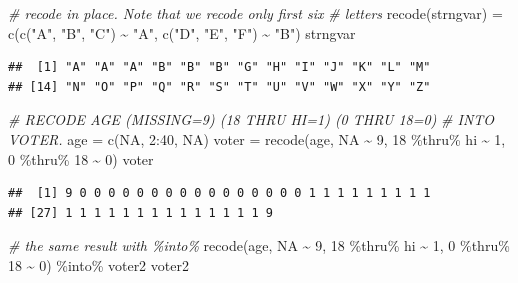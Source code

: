\documentclass[
]{book}
\newenvironment{Shaded}{\begin{snugshade}}{\end{snugshade}}
\newcommand{\CommentTok}[1]{\textcolor[rgb]{0.56,0.35,0.01}{\textit{#1}}}
\newcommand{\ConstantTok}[1]{\textcolor[rgb]{0.00,0.00,0.00}{#1}}
\newcommand{\DecValTok}[1]{\textcolor[rgb]{0.00,0.00,0.81}{#1}}
\newcommand{\FunctionTok}[1]{\textcolor[rgb]{0.00,0.00,0.00}{#1}}
\newcommand{\NormalTok}[1]{#1}
\newcommand{\OtherTok}[1]{\textcolor[rgb]{0.56,0.35,0.01}{#1}}
\newcommand{\SpecialCharTok}[1]{\textcolor[rgb]{0.00,0.00,0.00}{#1}}
\newcommand{\StringTok}[1]{\textcolor[rgb]{0.31,0.60,0.02}{#1}}
\begin{document}
\begin{Shaded}
\begin{Highlighting}[]
\CommentTok{\# recode in place. Note that we recode only first six}
\CommentTok{\# letters}
\FunctionTok{recode}\NormalTok{(strngvar) }\OtherTok{=} \FunctionTok{c}\NormalTok{(}\FunctionTok{c}\NormalTok{(}\StringTok{"A"}\NormalTok{, }\StringTok{"B"}\NormalTok{, }\StringTok{"C"}\NormalTok{) }\SpecialCharTok{\textasciitilde{}} \StringTok{"A"}\NormalTok{, }\FunctionTok{c}\NormalTok{(}\StringTok{"D"}\NormalTok{, }\StringTok{"E"}\NormalTok{,}
  \StringTok{"F"}\NormalTok{) }\SpecialCharTok{\textasciitilde{}} \StringTok{"B"}\NormalTok{)}
\NormalTok{strngvar}
\end{Highlighting}
\end{Shaded}

\begin{verbatim}
##  [1] "A" "A" "A" "B" "B" "B" "G" "H" "I" "J" "K" "L" "M"
## [14] "N" "O" "P" "Q" "R" "S" "T" "U" "V" "W" "X" "Y" "Z"
\end{verbatim}

\begin{Shaded}
\begin{Highlighting}[]
\CommentTok{\# RECODE AGE (MISSING=9) (18 THRU HI=1) (0 THRU 18=0)}
\CommentTok{\# INTO VOTER.}
\NormalTok{age }\OtherTok{=} \FunctionTok{c}\NormalTok{(}\ConstantTok{NA}\NormalTok{, }\DecValTok{2}\SpecialCharTok{:}\DecValTok{40}\NormalTok{, }\ConstantTok{NA}\NormalTok{)}
\NormalTok{voter }\OtherTok{=} \FunctionTok{recode}\NormalTok{(age, }\ConstantTok{NA} \SpecialCharTok{\textasciitilde{}} \DecValTok{9}\NormalTok{, }\DecValTok{18} \SpecialCharTok{\%thru\%}\NormalTok{ hi }\SpecialCharTok{\textasciitilde{}} \DecValTok{1}\NormalTok{, }\DecValTok{0} \SpecialCharTok{\%thru\%} \DecValTok{18} \SpecialCharTok{\textasciitilde{}}
  \DecValTok{0}\NormalTok{)}
\NormalTok{voter}
\end{Highlighting}
\end{Shaded}

\begin{verbatim}
##  [1] 9 0 0 0 0 0 0 0 0 0 0 0 0 0 0 0 0 1 1 1 1 1 1 1 1 1
## [27] 1 1 1 1 1 1 1 1 1 1 1 1 1 1 9
\end{verbatim}

\begin{Shaded}
\begin{Highlighting}[]
\CommentTok{\# the same result with \textquotesingle{}\%into\%\textquotesingle{}}
\FunctionTok{recode}\NormalTok{(age, }\ConstantTok{NA} \SpecialCharTok{\textasciitilde{}} \DecValTok{9}\NormalTok{, }\DecValTok{18} \SpecialCharTok{\%thru\%}\NormalTok{ hi }\SpecialCharTok{\textasciitilde{}} \DecValTok{1}\NormalTok{, }\DecValTok{0} \SpecialCharTok{\%thru\%} \DecValTok{18} \SpecialCharTok{\textasciitilde{}} \DecValTok{0}\NormalTok{) }\SpecialCharTok{\%into\%}
\NormalTok{  voter2}
\NormalTok{voter2}
\end{Highlighting}
\end{Shaded}
\end{document}
